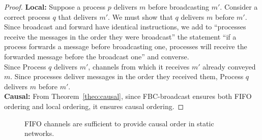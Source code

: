 \begin{proof}
  \textbf{Local:} Suppose a process $p$ delivers $m$ before broadcasting
  $m'$. Consider a correct process $q$ that delivers $m'$. We must show that $q$
  delivers $m$ before $m'$. \\
  Since broadcast and forward have identical instructions, we add to ``processes
  receive the messages in the order they were broadcast'' the statement ``if a
  process forwards a message before broadcasting one, processes will receive the
  forwarded message before the broadcast one'' and converse. \\
  Since Process $q$ delivers $m'$, channels from which it receives $m'$ already
  conveyed $m$. Since processes deliver messages in the order they received
  them, Process $q$ delivers $m$ before $m'$. \\
  \textbf{Causal:} From Theorem~\ref{theo:causal}, since FBC-broadcast ensures
  both FIFO ordering and local ordering, it ensures causal ordering.
\end{proof}


\begin{figure}
  \begin{center}
    
    \caption{\label{fig:static}FIFO channels are sufficient to provide causal
      order in static networks.}
  \end{center}
\end{figure}

